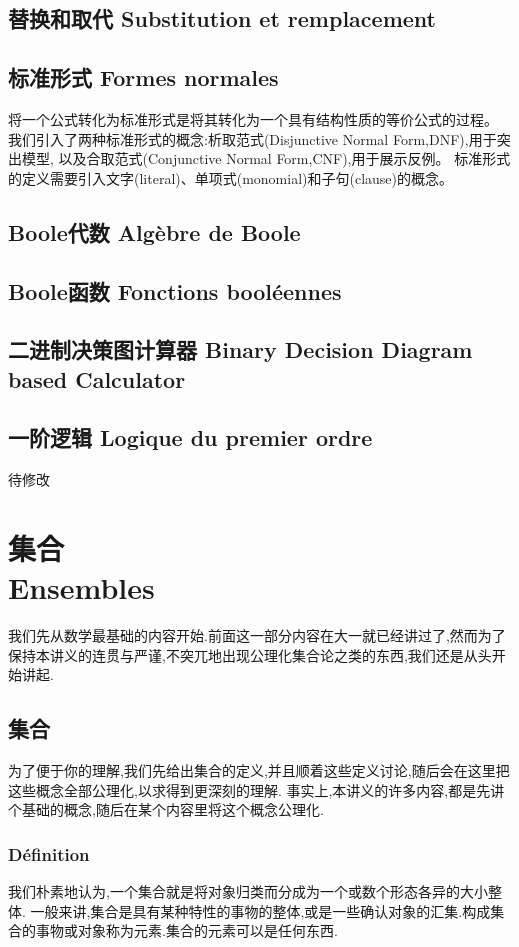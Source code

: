 \documentclass[12pt, a4paper, oneside]{ctexbook}
\begin{document}
  \section{替换和取代 Substitution et remplacement}
  \section{标准形式 Formes normales}
  将一个公式转化为标准形式是将其转化为一个具有结构性质的等价公式的过程。
  我们引入了两种标准形式的概念:析取范式(Disjunctive Normal Form,DNF),用于突出模型,
  以及合取范式(Conjunctive Normal Form,CNF),用于展示反例。
  标准形式的定义需要引入文字(literal)、单项式(monomial)和子句(clause)的概念。


  \section{Boole代数 Algèbre de Boole}
  \section{Boole函数 Fonctions booléennes}
  \section{二进制决策图计算器 Binary Decision Diagram based Calculator}
\section{一阶逻辑 Logique du premier ordre}
  待修改






\chapter{集合\\ Ensembles}
  我们先从数学最基础的内容开始.前面这一部分内容在大一就已经讲过了,然而为了保持本讲义的连贯与严谨,不突兀地出现公理化集合论之类的东西,我们还是从头开始讲起.
\section{集合}
  为了便于你的理解,我们先给出集合的定义,并且顺着这些定义讨论,随后会在这里把这些概念全部公理化,以求得到更深刻的理解.
  事实上,本讲义的许多内容,都是先讲个基础的概念,随后在某个内容里将这个概念公理化.
  \subsection{Définition}
  我们朴素地认为,一个集合就是将对象归类而分成为一个或数个形态各异的大小整体.
  一般来讲,集合是具有某种特性的事物的整体,或是一些确认对象的汇集.构成集合的事物或对象称为元素.集合的元素可以是任何东西.
\end{document}
